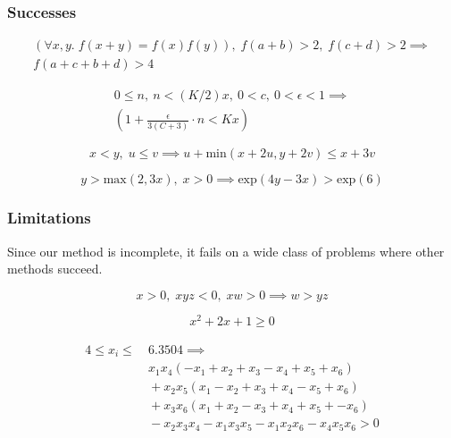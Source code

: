 \documentclass{beamer}
\newcommand{\fn}[1]{\text{#1}}
\begin{document}
\begin{frame}
 \frametitle{Successes}

  \begin{equation} \begin{split}
  (\forall x, y. \; f(x + y) = f(x) f(y)), \; f(a + b) > 2, \; f(c + d) > 2 \implies \\ f(a + c + b + d) > 4
 \end{split}\end{equation}
 

 \begin{equation}\begin{split}
 0 \le n,\ n < (K / 2) x,\ 0 < c,\ 0 < \epsilon < 1 \implies \\  \left(1 + \frac{\epsilon}{3(C + 3)}\cdot n < K x \right)
 \end{split}\end{equation} 
 
 \begin{equation}
  x < y, \; u \leq v \implies u + \fn{min}(x + 2u, y + 2v) \le x + 3v
 \end{equation}
 
 \begin{equation}
  y > \fn{max}(2, 3x), \; x>0 \implies \fn{exp}(4y - 3x) > \fn{exp}(6) 
 \end{equation}


\end{frame}


\begin{frame}
 \frametitle{Limitations}
 Since our method is incomplete, it fails on a wide class of problems where other methods succeed.
 
 \begin{equation}
   x > 0, \; x y z < 0, \; x w > 0 \implies w > yz
 \end{equation}
 
 
  \begin{equation}
  x^2 + 2x + 1 \geq 0
 \end{equation}

 
 \begin{gather}
\begin{split}
  4 \leq x_i \leq &\ 6.3504 \implies \\
    &\ x_1x_4(-x_1 + x_2 + x_3 - x_4 + x_5 + x_6) \\
  &\ + x_2x_5(x_1 - x_2 + x_3 + x_4 - x_5 + x_6) \\
  &\ + x_3x_6(x_1 + x_2 - x_3 + x_4 + x_5 + -x_6) \\
  &\ - x_2x_3x_4 -x_1x_3x_5 - x_1x_2x_6 - x_4x_5x_6 > 0
 \end{split}
 \label{eq:17}
\end{gather}
 


\end{frame}
\end{document}
